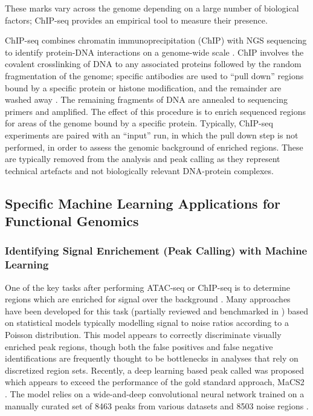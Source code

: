 These marks vary across the genome depending on a large number of biological factors; ChIP-seq provides an empirical tool to measure their presence. 

ChIP-seq combines chromatin immunoprecipitation (ChIP) with NGS sequencing to identify protein-DNA interactions on a genome-wide scale \cite{Park2009a}. ChIP involves the covalent crosslinking of DNA to any associated proteins followed by the random fragmentation of the genome; specific antibodies are used to ``pull down'' regions bound by a specific protein or histone modification, and the remainder are washed away \cite{Nakato2021,Furey2012}. The remaining fragments of DNA are annealed to sequencing primers and amplified. The effect of this procedure is to enrich sequenced regions for areas of the genome bound by a specific protein. Typically, ChIP-seq experiments are paired with an ``input'' run, in which the pull down step is not performed, in order to assess the genomic background of enriched regions. These are typically removed from the analysis and peak calling as they represent technical artefacts and not biologically relevant DNA-protein complexes. 

\subsection{Specific Machine Learning Applications for Functional Genomics}

\subsubsection{Identifying Signal Enrichement (Peak Calling) with Machine Learning}

One of the key tasks after performing ATAC-seq or ChIP-seq is to determine regions which are enriched for signal over the background \cite{Yan2020a}. Many approaches have been developed for this task (partially reviewed and benchmarked in \textcite{R2017}) based on statistical models typically modelling signal to noise ratios according to a Poisson distribution. This model appears to correctly discriminate visually enriched peak regions, though both the false positives and false negative identifications are frequently thought to be bottlenecks in analyses that rely on discretized region sets. Recently, a deep learning based peak called was proposed which appears to exceed the performance of the gold standard approach, MaCS2 \cite{Hentges2021a,Zhang2008,Gaspar2018}. The model relies on a wide-and-deep convolutional neural network trained on a manually curated set of 8463 peaks from various \textcite{ENCODEProjectConsortium2012} datasets and 8503 noise regions \cite{Cheng2016,Hentges2021a}. 

